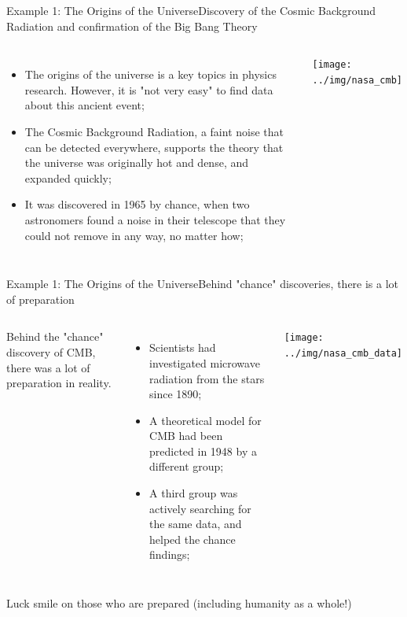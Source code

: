 
\begin{frame}{Example 1: The Origins of the Universe}{Discovery of the Cosmic Background Radiation and confirmation of the Big Bang Theory}

  \begin{columns}[T]

    \begin{itemize}
    \item The origins of the universe is a key topics in physics research. However, it is "not very easy" to find data about this ancient event;\bigskip 
    
    \item The Cosmic Background Radiation, a faint noise that can be detected everywhere, supports the theory that the universe was originally hot and dense, and expanded quickly;\bigskip 
    
    \item It was discovered in 1965 by chance, when two astronomers found a noise in their telescope that they could not remove in any way, no matter how;
    \end{itemize}
    \texttt{[image: ../img/nasa\_cmb]}
  \end{columns}
\end{frame}


\begin{frame}{Example 1: The Origins of the Universe}{Behind "chance" discoveries, there is a lot of preparation}

  \begin{columns}[T]

    Behind the "chance" discovery of CMB, there was a lot of preparation in reality.\medskip

    \begin{itemize}
      \item Scientists had investigated microwave radiation from the stars since 1890;\medskip
      
      \item A theoretical model for CMB had been predicted in 1948 by a different group;\medskip
      
      \item A third group was actively searching for the same data, and helped the chance findings;\medskip

    \end{itemize}
    \texttt{[image: ../img/nasa\_cmb\_data]}
  \end{columns}\bigskip

  Luck smile on those who are prepared (including humanity as a whole!)
\end{frame}

